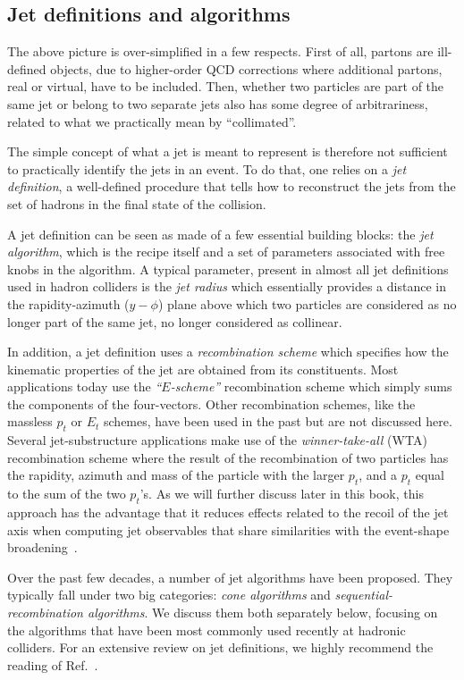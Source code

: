 \subsection{Jet definitions and algorithms}\label{sec:jet-algs}

The above picture is over-simplified in a few respects.
%
First of all, partons are ill-defined objects, \eg due to
higher-order QCD corrections where additional partons, real or
virtual, have to be included.
%
Then, whether two particles are part of the same jet or belong to two
separate jets also has some degree of arbitrariness, related to what
we practically mean by ``collimated''. 

The simple concept of what a jet is meant to represent is therefore
not sufficient to practically identify the jets in an event.
%
To do that, one relies on a {\em jet definition}, \ie a well-defined
procedure that tells how to reconstruct the jets from the set of
hadrons in the final state of the collision.

A jet definition can be seen as made of a few essential building
blocks: the {\em jet algorithm}, which is the recipe itself and a set
of parameters associated with free knobs in the algorithm. A typical
parameter, present in almost all jet definitions used in hadron
colliders is the {\em jet radius} which essentially provides a
distance in the rapidity-azimuth ($y-\phi$) plane above which two
particles are considered as no longer part of the same jet, \ie no
longer considered as collinear.

In addition, a jet definition uses a {\em recombination scheme} which
specifies how the kinematic properties of the jet are obtained from
its constituents.
%
Most applications today use the {\em ``$E$-scheme''} recombination
scheme which simply sums the components of the four-vectors. Other
recombination schemes, like the massless $p_t$ or $E_t$ schemes, have
been used in the past but are not discussed here.
%
Several jet-substructure applications make use of the {\em
  winner-take-all} (WTA) recombination scheme \cite{Larkoski:2014uqa}
where the result of the recombination of two particles has the
rapidity, azimuth and mass of the particle with the larger $p_t$, and
a $p_t$ equal to the sum of the two $p_t$'s. As we will further
discuss later in this book, this approach has the advantage that
it reduces effects related to the recoil of the jet axis when
computing jet observables that share similarities with the event-shape broadening~\cite{Rakow:1981qn}.

Over the past few decades, a number of jet algorithms have been
proposed. They typically fall under two big categories: {\em cone
  algorithms} and {\em sequential-recombination algorithms}. We
discuss them both separately below, focusing on the algorithms that
have been most commonly used recently at hadronic colliders.
%
For an extensive review on jet definitions, we highly recommend the
reading of Ref.~\cite{Salam:2009jx}.

